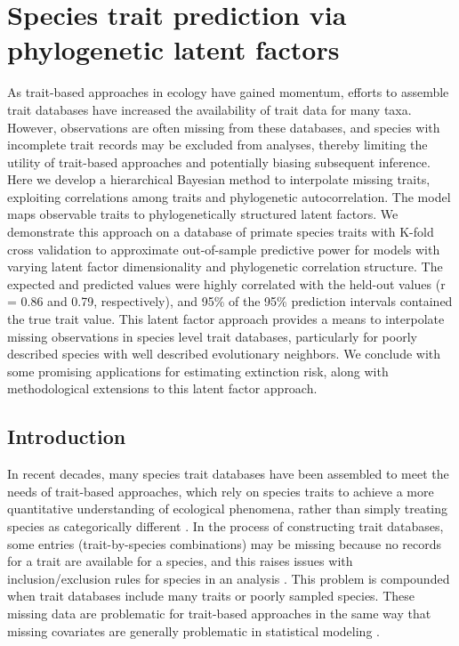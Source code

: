 \chapter{Species trait prediction via phylogenetic latent factors}

As trait-based approaches in ecology have gained momentum, efforts to assemble trait databases have increased the availability of trait data for many taxa.
However, observations are often missing from these databases, and species with incomplete trait records may be excluded from analyses, thereby limiting the utility of trait-based approaches and potentially biasing subsequent inference.
Here we develop a hierarchical Bayesian method to interpolate missing traits, exploiting correlations among traits and phylogenetic autocorrelation.
The model maps observable traits to phylogenetically structured latent factors.
We demonstrate this approach on a database of primate species traits with K-fold cross validation to approximate out-of-sample predictive power for models with varying latent factor dimensionality and phylogenetic correlation structure.
The expected and predicted values were highly correlated with the held-out values (r = 0.86 and 0.79, respectively), and 95\% of the 95\% prediction intervals contained the true trait value.
This latent factor approach provides a means to interpolate missing observations in species level trait databases, particularly for poorly described species with well described evolutionary neighbors.
We conclude with some promising applications for estimating extinction risk, along with methodological extensions to this latent factor approach.


\section{Introduction}

In recent decades, many species trait databases have been assembled to meet the needs of trait-based approaches, which rely on species traits to achieve a more quantitative understanding of ecological phenomena, rather than simply treating species as categorically different \citep{Ackerly2007, Gross2009, Webb2010}.
In the process of constructing trait databases, some entries (trait-by-species combinations) may be missing because no records for a trait are available for a species, and this raises issues with inclusion/exclusion rules for species in an analysis \citep{Nakagawa2008}.
This problem is compounded when trait databases include many traits or poorly sampled species.
These missing data are problematic for trait-based approaches in the same way that missing covariates are generally problematic in statistical modeling \citep{little2014statistical}.

